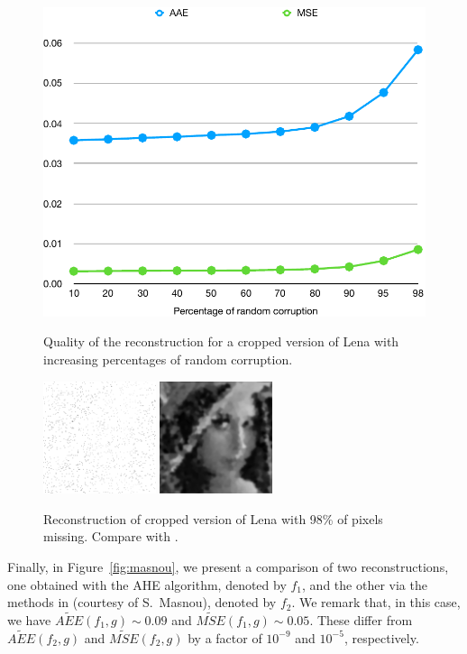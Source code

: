 \documentclass[proc]{edpsmath}
\begin{document}
{\begin{figure}
  \begin{minipage}{.55\textwidth}
  \centering
  \includegraphics[width=.7\textwidth]{imgs/graphAEE-MSE}
  \caption{Quality of the reconstruction for a cropped version of Lena with increasing percentages of random corruption.}
  \label{fig:graph}    
  \end{minipage} 
  \begin{minipage}{.43\textwidth}
  \centering
  \includegraphics[height=3.3cm]{imgs/lena-zoom-98-corr}\qquad
  \includegraphics[height=3.3cm]{imgs/lena-zoom-98-rec}
  \caption{Reconstruction of cropped version of Lena with 98\% of pixels missing. Compare with \cite[Figure~1]{GWWBBS}.}
  \label{fig:lena-AEE}    
  \end{minipage}
\end{figure}

Finally, in Figure~\ref{fig:masnou}, we present a comparison of two reconstructions, one obtained with the AHE algorithm, denoted by $f_1$, and the other via the methods in \cite{cao} (courtesy of S.\ Masnou), denoted by $f_2$. We remark that, in this case, we have $\widetilde{AEE}(f_1,g)\sim 0.09$ and $\widetilde{MSE}(f_1,g)\sim 0.05$. These differ from $\widetilde{AEE}(f_2,g)$ and $\widetilde{MSE}(f_2,g)$ by a factor of $10^{-9}$ and $10^{-5}$, respectively.

}
\end{document}
